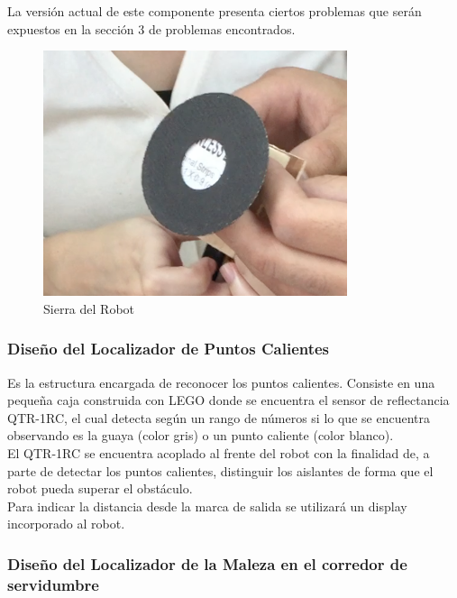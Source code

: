 \documentclass[conference]{IEEEtran}
\begin{document}
La versión actual de este componente presenta ciertos problemas que serán expuestos en la sección 3 de problemas encontrados.


\begin{figure}[htp]
	\centering
	\includegraphics[scale=0.5,type=png,ext=.png,read=.png]{sierra}
	\caption{Sierra del Robot}
	\label{fig:sierra}
\end{figure}


\bigskip
\subsubsection{Diseño del Localizador de Puntos Calientes}

\bigskip

Es la estructura encargada de reconocer los puntos calientes. Consiste en una pequeña caja construida con LEGO\textregistered \vspace{2mm} donde se encuentra el sensor de reflectancia QTR-1RC, el cual detecta según un rango de números si lo que se encuentra observando es la guaya (color gris) o un punto caliente (color blanco).\\ 

 
El QTR-1RC se encuentra acoplado al frente del robot con la finalidad de, a parte de detectar los puntos calientes, distinguir los aislantes de forma que el robot pueda superar el obstáculo.\\


Para indicar la distancia desde la marca de salida se utilizará un display incorporado al robot. \\

\bigskip
\subsubsection{Diseño del Localizador de la Maleza en el corredor de servidumbre}
\end{document}
